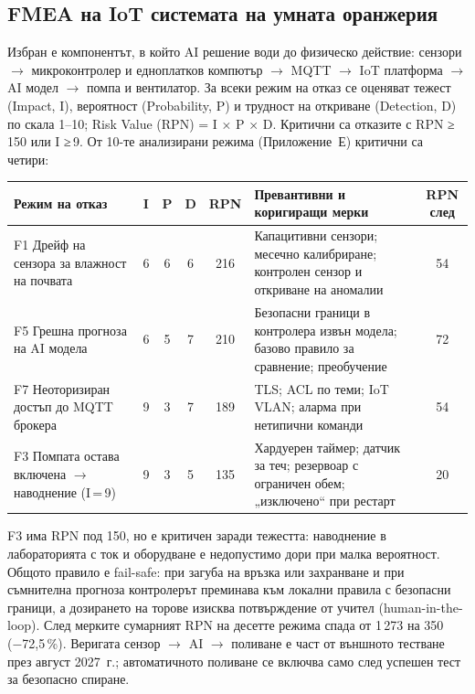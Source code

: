 \documentclass[11pt,a4paper]{article}
\renewcommand{\arraystretch}{1.15}
\begin{document}
\subsection{FMEA на IoT системата на умната оранжерия}

Избран е компонентът, в който AI решение води до физическо действие: сензори $\to$ микроконтролер и едноплатков компютър $\to$ MQTT $\to$ IoT платформа $\to$ AI модел $\to$ помпа и вентилатор. За всеки режим на отказ се оценяват тежест (Impact, I), вероятност (Probability, P) и трудност на откриване (Detection, D) по скала 1–10; Risk Value (RPN) = I × P × D. Критични са отказите с RPN ≥\,150 или I ≥\,9. От 10-те анализирани режима (Приложение~Е) критични са четири:

\begingroup\footnotesize
\setlength{\tabcolsep}{3.5pt}
\renewcommand{\arraystretch}{1.1}
\noindent\begin{tabularx}{\textwidth}{@{}>{\raggedright\arraybackslash}p{4.4cm}cccc>{\raggedright\arraybackslash}X c@{}}
\toprule
\rowcolor{sand}\textbf{Режим на отказ} & \textbf{I} & \textbf{P} & \textbf{D} & \textbf{RPN} & \textbf{Превантивни и коригиращи мерки} & \textbf{RPN след}\\
\midrule
F1 Дрейф на сензора за влажност на почвата & 6 & 6 & 6 & \cellcolor{riskH}216 & Капацитивни сензори; месечно калибриране; контролен сензор и откриване на аномалии & 54\\
F5 Грешна прогноза на AI модела & 6 & 5 & 7 & \cellcolor{riskH}210 & Безопасни граници в контролера извън модела; базово правило за сравнение; преобучение & 72\\
F7 Неоторизиран достъп до MQTT брокера & 9 & 3 & 7 & \cellcolor{riskH}189 & TLS; ACL по теми; IoT VLAN; аларма при нетипични команди & 54\\
F3 Помпата остава включена $\to$ наводнение (I\,=\,9) & 9 & 3 & 5 & \cellcolor{riskH}135 & Хардуерен таймер; датчик за теч; резервоар с ограничен обем; „изключено“ при рестарт & 20\\
\bottomrule
\end{tabularx}
\endgroup

F3 има RPN под 150, но е критичен заради тежестта: наводнение в лабораторията с ток и оборудване е недопустимо дори при малка вероятност. Общото правило е fail-safe: при загуба на връзка или захранване и при съмнителна прогноза контролерът преминава към локални правила с безопасни граници, а дозирането на торове изисква потвърждение от учител (human-in-the-loop). След мерките сумарният RPN на десетте режима спада от 1\,273 на 350 (−72,5\,\%). Веригата сензор $\to$ AI $\to$ поливане е част от външното тестване през август 2027~г.; автоматичното поливане се включва само след успешен тест за безопасно спиране.
\end{document}
